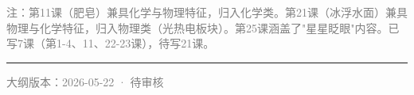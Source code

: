 \documentclass[a4paper,12pt]{ctexart}
\begin{document}
\vspace{0.3cm}

\textcolor{gray}{\small 注：第11课（肥皂）兼具化学与物理特征，归入化学类。第21课（冰浮水面）兼具物理与化学特征，归入物理类（光热电板块）。第25课涵盖了"星星眨眼"内容。已写7课（第1-4、11、22-23课），待写21课。}

\vspace{0.5cm}

\begin{center}
\rule{0.5\textwidth}{0.5pt}
\vspace{0.3cm}
\textcolor{gray}{\small 大纲版本：2026-05-22 · 待审核}
\end{center}
\end{document}
